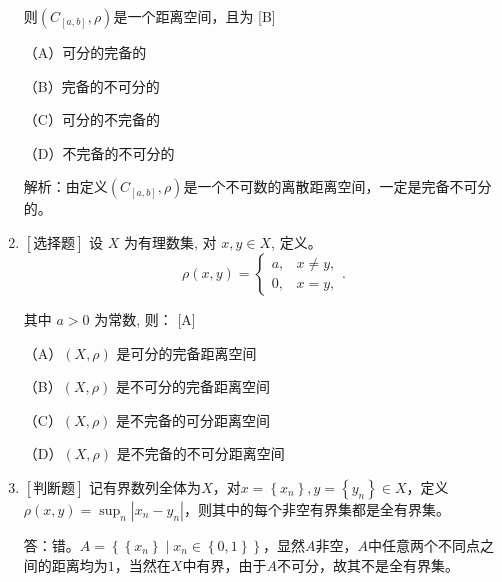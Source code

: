 \documentclass{article}
\begin{document}
\begin{enumerate}
    则$(C_{[a,b]}, \rho)$是一个距离空间，且为 \hfill [B]

    \begin{minipage}[t]{0.45\linewidth}
    （A）可分的完备的
    \end{minipage}
    \hfill
    \begin{minipage}[t]{0.45\linewidth}
    （B）完备的不可分的
    \end{minipage}
    \begin{minipage}[t]{0.45\linewidth}
    （C）可分的不完备的
    \end{minipage}
    \hfill
    \begin{minipage}[t]{0.45\linewidth}
    （D）不完备的不可分的
    \end{minipage}

    解析：由定义$(C_{[a,b]}, \rho)$是一个不可数的离散距离空间，一定是完备不可分的。

    \item $\left[\textbf{选择题}\right]$ 设 $X$ 为有理数集, 对 $x, y \in X$, 定义。
$$
\rho(x, y)=\left\{\begin{array}{ll}
a, & x \neq y, \\
0, & x=y,
\end{array} .\right.
$$

其中 $a>0$ 为常数, 则： \hfill [A]

    \begin{minipage}[t]{0.45\linewidth}
    （A）$(X, \rho)$ 是可分的完备距离空间
    \end{minipage}
    \hfill
    \begin{minipage}[t]{0.45\linewidth}
    （B）$(X, \rho)$ 是不可分的完备距离空间
    \end{minipage}
    \begin{minipage}[t]{0.45\linewidth}
    （C）$(X, \rho)$ 是不完备的可分距离空间
    \end{minipage}
    \hfill
    \begin{minipage}[t]{0.45\linewidth}
    （D）$(X, \rho)$ 是不完备的不可分距离空间
    \end{minipage}
    
    \item $\left[\textbf{判断题}\right]$ 记有界数列全体为$X$，对$x=\left\{x_n\right\}, y=\left\{y_n\right\} \in X$，定义$\rho\left(x, y\right)=\sup _n\left|x_n-y_n\right|$，则其中的每个非空有界集都是全有界集。

    答：错。$A=\left\{\left\{x_n\right\} \mid x_n \in \left\{0, 1\right\}\right\}$，显然$A$非空，$A$中任意两个不同点之间的距离均为$1$，当然在$X$中有界，由于$A$不可分，故其不是全有界集。


\end{enumerate}
\end{document}
